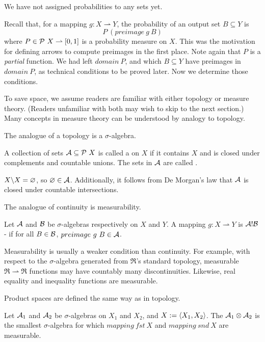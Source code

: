 \documentclass[preprint]{sigplanconf}
\newcommand{\pto}{\rightharpoonup}
\begin{document}
We have not assigned probabilities to any sets yet.

Recall that, for a mapping $g : X \pto Y$, the probability of an output set $B \subseteq Y$ is
\begin{equation}
	P~(preimage~g~B)
\end{equation}
where $P \in \powerset~X \pto [0,1]$ is a probability measure on $X$.
This was the motivation for defining arrows to compute preimages in the first place.
Note again that $P$ is a \emph{partial} function.
We had left $domain~P$, and which $B \subseteq Y$ have preimages in $domain~P$, as technical conditions to be proved later.
Now we determine those conditions.

To save space, we assume readers are familiar with either topology or measure theory.
(Readers unfamiliar with both may wish to skip to the next section.)
Many concepts in measure theory can be understood by analogy to topology.

The analogue of a topology is a $\sigma$-algebra.

\begin{definition}
A collection of sets $\mathcal{A} \subseteq \mathcal{P}~X$ is called a  on $X$ if it contains $X$ and is closed under complements and countable unions.
The sets in $\mathcal{A}$ are called .
\end{definition}

$X \backslash X = \varnothing$, so $\varnothing \in \mathcal{A}$.
Additionally, it follows from De Morgan's law that $\mathcal{A}$ is closed under countable intersections.

The analogue of continuity is measurability.

\begin{definition}
Let $\mathcal{A}$ and $\mathcal{B}$ be $\sigma$-algebras respectively on $X$ and $Y$.
A mapping $g : X \pto Y$ is $\mathcal{A}!\mathcal{B}$- if for all $B \in \mathcal{B}$, $preimage~g~B \in \mathcal{A}$.
\end{definition}

Measurability is usually a weaker condition than continuity.
For example, with respect to the $\sigma$-algebra generated from $\Re$'s standard topology, measurable $\Re \pto \Re$ functions may have countably many discontinuities.
Likewise, real equality and inequality functions are measurable.

Product spaces are defined the same way as in topology.

\begin{definition}
Let $\mathcal{A}_1$ and $\mathcal{A}_2$ be $\sigma$-algebras on $X_1$ and $X_2$, and $X := \langle{X_1,X_2}\rangle$.
The  $\mathcal{A}_1 \otimes \mathcal{A}_2$ is the smallest $\sigma$-algebra for which $mapping~fst~X$ and $mapping~snd~X$ are measurable.
\label{def:finite-product-sigma-algebra}
\end{definition}
\end{document}
